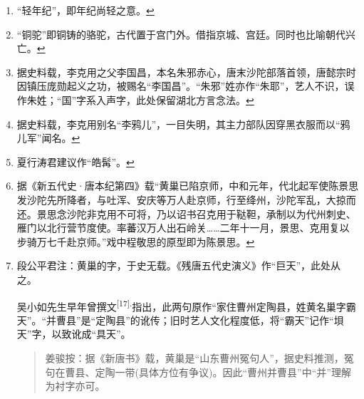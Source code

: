 \begin{enumerate}
\item
  \leavevmode\hypertarget{fn388}{}%
  ``轻年纪''，即年纪尚轻之意。\protect\hyperlink{fnref388}{↩}
\item
  \leavevmode\hypertarget{fn389}{}%
  ``铜驼''即铜铸的骆驼，古代置于宫门外。借指京城、宫廷。同时也比喻朝代兴亡。\protect\hyperlink{fnref389}{↩}
\item
  \leavevmode\hypertarget{fn390}{}%
  据史料载，李克用之父李国昌，本名朱邪赤心，唐末沙陀部落首领，唐懿宗时因镇压庞勋起义之功，被赐名``李国昌''。``朱邪''姓亦作``朱耶''，艺人不识，误作朱姓；``国''字系入声字，此处保留湖北方言念法。\protect\hyperlink{fnref390}{↩}
\item
  \leavevmode\hypertarget{fn391}{}%
  据史料载，李克用别名``李鸦儿''，一目失明，其主力部队因穿黑衣服而以``鸦儿军''闻名。\protect\hyperlink{fnref391}{↩}
\item
  \leavevmode\hypertarget{fn392}{}%
  夏行涛君建议作``皓髯''。\protect\hyperlink{fnref392}{↩}
\item
  \leavevmode\hypertarget{fn393}{}%
  据《新五代史·唐本纪第四》载``黄巢已陷京师，中和元年，代北起军使陈景思发沙陀先所降者，与吐浑、安庆等万人赴京师，行至绛州，沙陀军乱，大掠而还。景思念沙陀非克用不可将，乃以诏书召克用于鞑靼，承制以为代州刺史、雁门以北行营节度使。率蕃汉万人出石岭关\ldots{}\ldots{}二年十一月，景思、克用复以步骑万七千赴京师。''戏中程敬思的原型即为陈景思。\protect\hyperlink{fnref393}{↩}
\item
  \leavevmode\hypertarget{fn394}{}%
  段公平君注：黄巢的字，于史无载。《残唐五代史演义》作``巨天''，此处从之。

  吴小如先生早年曾撰文\textsuperscript{{[}17{]}.}指出，此两句原作``家住曹州定陶县，姓黄名巢字霸天''。``并曹县''是``定陶县''的讹传；旧时艺人文化程度低，将``霸天''记作``垻天''字，以致讹成``具天''。

  \begin{quote}
  姜骏按：据《新唐书》载，黄巢是``山东曹州冤句人''，据史料推测，冤句在曹县、定陶一带(具体方位有争议)。因此``曹州并曹县''中``并''理解为衬字亦可。
  \end{quote}


\end{enumerate}
